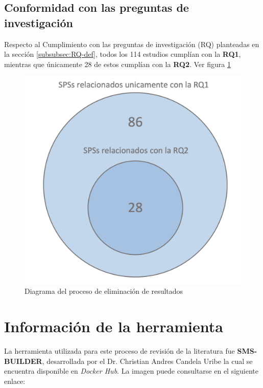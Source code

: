 \subsection{Conformidad con las preguntas de investigación}
Respecto al Cumplimiento con las preguntas de investigación (RQ) planteadas en la sección \ref{subsubsec:RQ-def}, todos los 114 estudios cumplían con la \textbf{RQ1}, mientras que únicamente 28 de estos cumplían con la \textbf{RQ2}. Ver figura \ref{fig:plot-venn-RQs}

\begin{figure}[H]
	\centering
	\includegraphics[scale=0.3] {tablas-images/sms/plot-venn-RQs.png}
	\caption{Diagrama del proceso de eliminación de resultados}\label{fig:plot-venn-RQs}
\end{figure}



\section{Información de la herramienta}

\noindent
La herramienta utilizada para este proceso de revisión de la literatura fue \textbf{SMS-BUILDER}, desarrollada por el Dr. Christian Andres Candela Uribe la cual se encuentra disponible en \textit{Docker Hub}. La imagen puede consultarse en el siguiente enlace:

